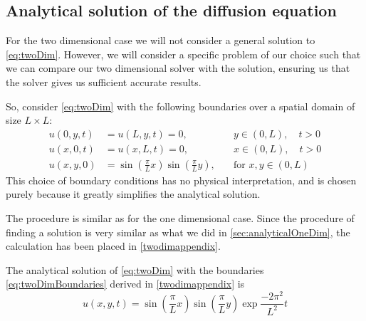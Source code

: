 \subsection{Analytical solution of the diffusion equation}
For the two dimensional case we will not consider a general solution to \vref{eq:twoDim}. However, we will consider a specific problem of our choice such that we can compare our two dimensional solver with the solution, ensuring us that the solver gives us sufficient accurate results.

So, consider \vref{eq:twoDim} with the following boundaries over a spatial domain of size \(L \times L\):
\begin{equation} \label{eq:twoDimBoundaries}
\begin{aligned}
u(0,y,t) &= u(L,y,t) = 0, \quad &y \in (0,L),\quad t > 0 \\
u(x,0,t) &= u(x,L,t) = 0, \quad &x \in (0,L),\quad t > 0 \\
u(x,y,0) &= \sin(\frac{\pi}{L}x)\sin(\frac{\pi}{L}y), \quad&\text{for }x,y\in (0,L)
\end{aligned}
\end{equation}
This choice of boundary conditions has no physical interpretation, and is chosen purely because it greatly simplifies the analytical solution.

The procedure is similar as for the one dimensional case. Since the procedure of finding a solution is very similar as what we did in \vref{sec:analyticalOneDim}, the calculation has been placed in \ref{twodimappendix}.

The analytical solution of \vref{eq:twoDim} with the boundaries \vref{eq:twoDimBoundaries} derived in \ref{twodimappendix} is
\begin{equation} \label{eq:analyticalSolutionTwoDim}
u(x,y,t) = \sin(\frac{\pi}{L}x)\sin(\frac{\pi}{L}y)\exp{\frac{-2\pi^2}{L^2}t}
\end{equation}

